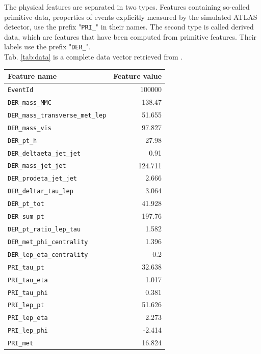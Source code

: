 The physical features are separated in two types. Features containing so-called primitive data, properties of events explicitly measured by the simulated ATLAS detector, use the prefix "\texttt{PRI\_}" in their names. The second type is called derived data, which are features that have been computed from primitive features. Their labels use the prefix "\texttt{DER\_}".\\
Tab. \ref{tab:data} is a complete data vector retrieved from \cite{higgsData}.

\begin{table}
\begin{center}
	\begin{tabular}{|l|r|}
		\hline
		Feature name & Feature value \\
		\hline
		\texttt{EventId} & 100000 \\
		\hline
		\texttt{DER\_mass\_MMC} & 138.47 \\
		\hline
		\texttt{DER\_mass\_transverse\_met\_lep} & 51.655 \\
		\hline
		\texttt{DER\_mass\_vis} & 97.827 \\
		\hline
		\texttt{DER\_pt\_h} & 27.98 \\
		\hline
		\texttt{DER\_deltaeta\_jet\_jet} & 0.91 \\
		\hline
		\texttt{DER\_mass\_jet\_jet} & 124.711 \\
		\hline
		\texttt{DER\_prodeta\_jet\_jet} & 2.666 \\
		\hline
		\texttt{DER\_deltar\_tau\_lep} & 3.064 \\
		\hline
		\texttt{DER\_pt\_tot} & 41.928 \\
		\hline
		\texttt{DER\_sum\_pt} & 197.76 \\
		\hline
		\texttt{DER\_pt\_ratio\_lep\_tau} & 1.582 \\
		\hline
		\texttt{DER\_met\_phi\_centrality} & 1.396 \\
		\hline
		\texttt{DER\_lep\_eta\_centrality} & 0.2 \\
		\hline
		\texttt{PRI\_tau\_pt} & 32.638 \\
		\hline
		\texttt{PRI\_tau\_eta} & 1.017 \\
		\hline
		\texttt{PRI\_tau\_phi} & 0.381 \\
		\hline
		\texttt{PRI\_lep\_pt} & 51.626 \\
		\hline
		\texttt{PRI\_lep\_eta} & 2.273 \\
		\hline
		\texttt{PRI\_lep\_phi} & -2.414 \\
		\hline
		\texttt{PRI\_met} & 16.824 \\

\end{tabular}
\end{center}
\end{table}
